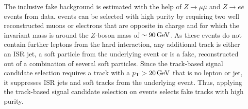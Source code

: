 The inclusive fake background is estimated with the help of $Z\rightarrow\mu\bar{\mu}$ and $Z\rightarrow e\bar{e}$ events from data.
\Zlep events can be selected with high purity by requiring two well reconstructed muons or electrons that are opposite in charge and for which the invariant mass is around the $Z$-boson mass of $\sim90\,\text{Ge}\kern-0.06667em\text{V}$.
As these events do not contain further leptons from the hard interaction, any additional track is either an ISR jet, a soft particle from the underlying event or is a fake, reconstructed out of a combination of several soft particles.
Since the track-based signal candidate selection requires a track with a $p_{\text{T}}>20\,\text{Ge}\kern-0.06667em\text{V}$ that is no lepton or jet, it suppresses ISR jets and soft tracks from the underlying event.
Thus, applying the track-based signal candidate selection on \Zlep events selects fake tracks with high purity.


